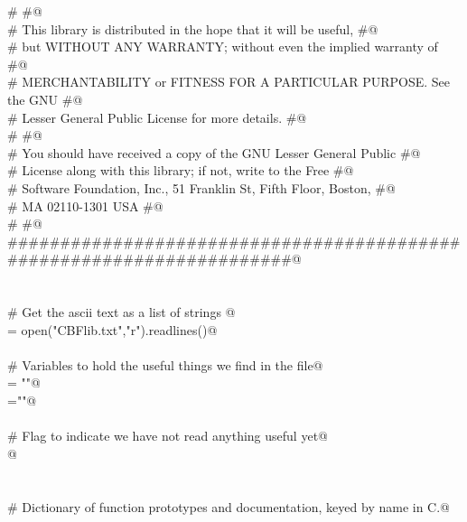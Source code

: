 \documentclass[10pt,a4paper,twoside,notitlepage]{article}
\begin{document}
\begin{flushleft}
\begin{minipage}{\linewidth}
\begin{list}{}{}
\mbox{}\verb@#                                                                    #@\\
\mbox{}\verb@# This library is distributed in the hope that it will be useful,    #@\\
\mbox{}\verb@# but WITHOUT ANY WARRANTY; without even the implied warranty of     #@\\
\mbox{}\verb@# MERCHANTABILITY or FITNESS FOR A PARTICULAR PURPOSE.  See the GNU  #@\\
\mbox{}\verb@# Lesser General Public License for more details.                    #@\\
\mbox{}\verb@#                                                                    #@\\
\mbox{}\verb@# You should have received a copy of the GNU Lesser General Public   #@\\
\mbox{}\verb@# License along with this library; if not, write to the Free         #@\\
\mbox{}\verb@# Software Foundation, Inc., 51 Franklin St, Fifth Floor, Boston,    #@\\
\mbox{}\verb@# MA  02110-1301  USA                                                #@\\
\mbox{}\verb@#                                                                    #@\\
\mbox{}\verb@######################################################################@\\
\mbox{}\verb@@\\
\mbox{}\verb@@\\
\mbox{}\verb@# Get the ascii text as a list of strings @\\
\mbox{}\verb@lines = open("CBFlib.txt","r").readlines()@\\
\mbox{}\verb@@\\
\mbox{}\verb@# Variables to hold the useful things we find in the file@\\
\mbox{}\verb@docstring = "\n"@\\
\mbox{}\verb@name=""@\\
\mbox{}\verb@@\\
\mbox{}\verb@# Flag to indicate we have not read anything useful yet@\\
\mbox{}@\\
\mbox{}\verb@@\\
\mbox{}\verb@@\\
\mbox{}\verb@# Dictionary of function prototypes and documentation, keyed by name in C.@\\

\end{list}
\end{minipage}
\end{flushleft}
\end{document}
